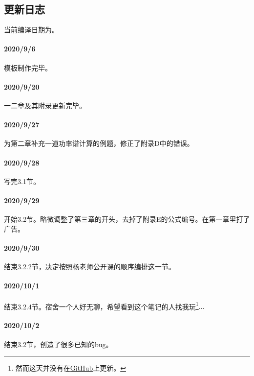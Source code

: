 \subsection{更新日志}
    当前编译日期为。
    \paragraph{2020/9/6}模板制作完毕。
    \paragraph{2020/9/20}一二章及其附录更新完毕。
    \paragraph{2020/9/27}为第二章补充一道功率谱计算的例题，修正了附录D中的错误。
    \paragraph{2020/9/28}写完3.1节。
    \paragraph{2020/9/29}开始3.2节。略微调整了第三章的开头，去掉了附录E的公式编号。在第一章里打了广告。
    \paragraph{2020/9/30}结束3.2.2节，决定按照杨老师公开课的顺序编排这一节。
    \paragraph{2020/10/1}结束3.2.4节。宿舍一个人好无聊，希望看到这个笔记的人找我玩\footnote{然而这天并没有在\href{https://github.com/phydx0803/BuptPoCNoteBook/}{GitHub}上更新。}$\ldots$
    \paragraph{2020/10/2}结束3.2节，创造了很多已知的bug。